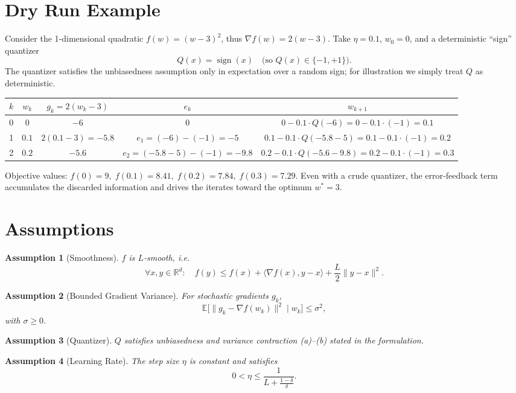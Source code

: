 \documentclass{article}
\newtheorem{assumption}{Assumption}
\newcommand{\E}{\mathbb{E}}
\newcommand{\R}{\mathbb{R}}
\begin{document}
\section*{Dry Run Example}
Consider the 1‑dimensional quadratic $f(w)=(w-3)^{2}$, thus $\nabla f(w)=2(w-3)$.  
Take $\eta=0.1$, $w_{0}=0$, and a deterministic “sign” quantizer
\[
Q(x)=\operatorname{sign}(x)\quad\text{(so }Q(x)\in\{-1,+1\}\text{)} .
\]
The quantizer satisfies the unbiasedness assumption only in expectation over a random sign; for illustration we simply treat $Q$ as deterministic.

\begin{center}
\begin{tabular}{c|c|c|c|c}
$k$ & $w_{k}$ & $g_{k}=2(w_{k}-3)$ & $e_{k}$ & $w_{k+1}$ \\ \hline
0 & $0$ & $-6$ & $0$ & $0-0.1\cdot Q(-6)=0-0.1\cdot(-1)=0.1$ \\
1 & $0.1$ & $2(0.1-3)=-5.8$ & $e_{1}=(-6)-(-1)=-5$ & $0.1-0.1\cdot Q(-5.8-5)=0.1-0.1\cdot(-1)=0.2$ \\
2 & $0.2$ & $-5.6$ & $e_{2}=(-5.8-5)-(-1)=-9.8$ & $0.2-0.1\cdot Q(-5.6-9.8)=0.2-0.1\cdot(-1)=0.3$
\end{tabular}
\end{center}
Objective values:
$f(0)=9,\; f(0.1)=8.41,\; f(0.2)=7.84,\; f(0.3)=7.29$.
Even with a crude quantizer, the error‑feedback term accumulates the discarded information and drives the iterates toward the optimum $w^{*}=3$.

\newpage
\section*{Assumptions}
\begin{assumption}[Smoothness]\label{ass:smooth}
$f$ is $L$‑smooth, i.e.
\[
\forall x,y\in\R^{d}:\quad f(y)\le f(x)+\langle\nabla f(x),y-x\rangle+\frac{L}{2}\|y-x\|^{2}.
\]
\end{assumption}
\begin{assumption}[Bounded Gradient Variance]\label{ass:var}
For stochastic gradients $g_{k}$,
\[
\E\!\big[\|g_{k}-\nabla f(w_{k})\|^{2}\mid w_{k}\big]\le\sigma^{2},
\]
with $\sigma\ge0$.
\end{assumption}
\begin{assumption}[Quantizer]\label{ass:q}
$Q$ satisfies unbiasedness and variance contraction (a)–(b) stated in the formulation.
\end{assumption}
\begin{assumption}[Learning Rate]\label{ass:lr}
The step size $\eta$ is constant and satisfies
\[
0<\eta\le\frac{1}{L+\frac{1-\delta}{\delta}}.
\]
\end{assumption}
\end{document}

